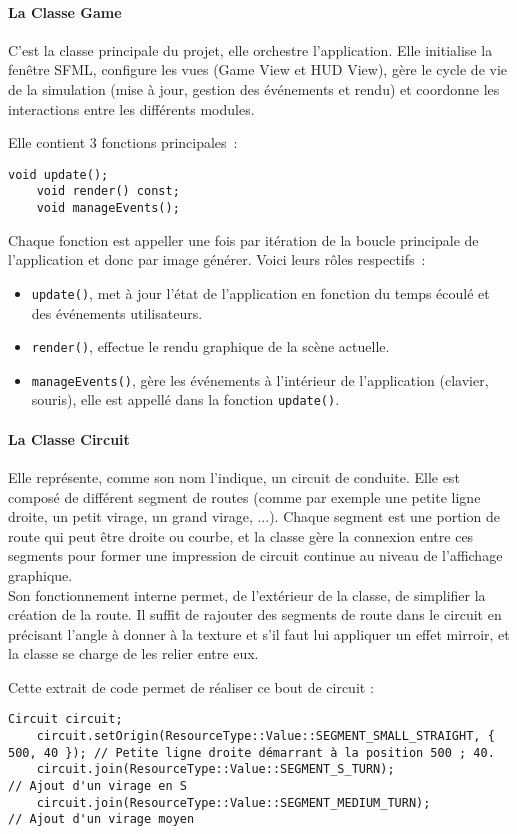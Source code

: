 \paragraph[Game]{La Classe \textbf{Game}}
C'est la classe principale du projet, elle orchestre l'application.
Elle initialise la fenêtre SFML, configure les vues (Game View et HUD View), gère le cycle de vie de la simulation (mise à jour, gestion des événements et rendu) et coordonne les interactions entre les différents modules.

Elle contient 3 fonctions principales :
\begin{lstlisting}[style=CStyle, label={lst:game_class}]
    void update();
    void render() const;
    void manageEvents();
\end{lstlisting}
Chaque fonction est appeller une fois par itération de la boucle principale de l'application et donc par image générer.
Voici leurs rôles respectifs :
\begin{itemize}
    \item \texttt{update()}, met à jour l'état de l'application en fonction du temps écoulé et des événements utilisateurs.
    \item \texttt{render()}, effectue le rendu graphique de la scène actuelle.
    \item \texttt{manageEvents()}, gère les événements à l'intérieur de l'application (clavier, souris), elle est appellé dans la fonction \texttt{update()}.
\end{itemize}

\paragraph[Circuit]{La Classe \textbf{Circuit}}
Elle représente, comme son nom l'indique, un circuit de conduite. Elle est composé de différent segment de routes (comme par exemple une petite ligne droite, un petit virage, un grand virage, ...).
Chaque segment est une portion de route qui peut être droite ou courbe, et la classe gère la connexion entre ces segments pour former une impression de circuit continue au niveau de l'affichage graphique. \\
Son fonctionnement interne permet, de l'extérieur de la classe, de simplifier la création de la route.
Il suffit de rajouter des segments de route dans le circuit en précisant l'angle à donner à la texture et s'il faut lui appliquer un effet mirroir, et la classe se charge de les relier entre eux.

Cette extrait de code permet de réaliser ce bout de circuit :
\begin{lstlisting}[style=CStyle, label={lst:code_circuit}]
    Circuit circuit;
    circuit.setOrigin(ResourceType::Value::SEGMENT_SMALL_STRAIGHT, { 500, 40 }); // Petite ligne droite démarrant à la position 500 ; 40.
    circuit.join(ResourceType::Value::SEGMENT_S_TURN);                           // Ajout d'un virage en S
    circuit.join(ResourceType::Value::SEGMENT_MEDIUM_TURN);                      // Ajout d'un virage moyen
\end{lstlisting}

